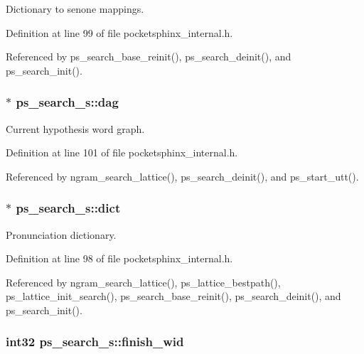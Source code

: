 Dictionary to senone mappings. 



Definition at line 99 of file pocketsphinx\+\_\+internal.\+h.



Referenced by ps\+\_\+search\+\_\+base\+\_\+reinit(), ps\+\_\+search\+\_\+deinit(), and ps\+\_\+search\+\_\+init().

\subsubsection[{dag}]{$\ast$ ps\+\_\+search\+\_\+s\+::dag}\label{structps__search__s_a897f46c55d17e817ff1364f555b31463}


Current hypothesis word graph. 



Definition at line 101 of file pocketsphinx\+\_\+internal.\+h.



Referenced by ngram\+\_\+search\+\_\+lattice(), ps\+\_\+search\+\_\+deinit(), and ps\+\_\+start\+\_\+utt().

\subsubsection[{dict}]{$\ast$ ps\+\_\+search\+\_\+s\+::dict}\label{structps__search__s_a918f243fa966e72c47f697fb9e60089d}


Pronunciation dictionary. 



Definition at line 98 of file pocketsphinx\+\_\+internal.\+h.



Referenced by ngram\+\_\+search\+\_\+lattice(), ps\+\_\+lattice\+\_\+bestpath(), ps\+\_\+lattice\+\_\+init\+\_\+search(), ps\+\_\+search\+\_\+base\+\_\+reinit(), ps\+\_\+search\+\_\+deinit(), and ps\+\_\+search\+\_\+init().

\subsubsection[{finish\+\_\+wid}]{\setlength{\rightskip}{0pt plus 5cm}int32 ps\+\_\+search\+\_\+s\+::finish\+\_\+wid}\label{structps__search__s_a0fb4d79f1084bdbbc0a808513f7c1ca7}


